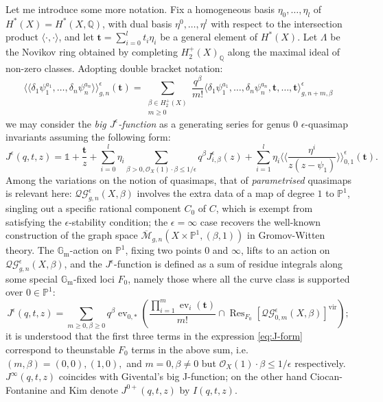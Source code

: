 \documentclass[11pt]{amsart}
\newcommand{\M}[4]{\overline{\mathcal{M}}_{#1,#2}(#3,#4)}
\newcommand{\QGe}[4]{\mathcal{QG}^{\epsilon}_{#1,#2}(#3,#4)}
\newcommand{\PP}{\mathbb P}
\newcommand{\QQ}{\mathbb{Q}}
\newcommand{\OO}{\mathcal{O}}
\newcommand{\Gm}{\mathbb{G}_{\text{m}}}
\newcommand{\virt}[1]{[#1]^{\operatorname{vir}}}
\newcommand{\lala}{\langle\!\langle}
\newcommand{\rara}{\rangle\!\rangle}
\newcommand{\ev}{\operatorname{ev}}
\theoremstyle{definition}
\theoremstyle{definition}
\newcommand{\ilemph}[1]{\emph{#1}}
\begin{document}
Let me introduce some more notation. Fix a homogeneous basis $\eta_0,\ldots,\eta_l$ of $H^*(X)=H^*(X,\QQ)$, with dual basis $\eta^0,\ldots,\eta^l$ with respect to the intersection product $\langle\cdot,\cdot\rangle$, and let $\mathbf{t}=\sum_{i=0}^lt_i\eta_i$ be a general element of $H^*(X)$. Let $\Lambda$ be the Novikov ring obtained by completing $ H_2^+(X)_\QQ$ along the maximal ideal of non-zero classes. Adopting double bracket notation:
\[\lala\delta_1\psi_1^{a_1},\ldots,\delta_n\psi_n^{a_n}\rara^\epsilon_{g,n}(\mathbf{t})=\sum_{\substack{\beta\in H_2^+(X) \\ m\geq 0}}\frac{q^\beta}{m!}\langle \delta_1\psi_1^{a_1},\ldots,\delta_n\psi_n^{a_n},\mathbf t,\ldots,\mathbf t\rangle^{\epsilon}_{g,n+m,\beta} \]
we may consider the \ilemph{big $J^\epsilon$-function} as a generating series for genus $0$ $\epsilon$-quasimap invariants assuming the following form:
\begin{equation}\label{eq:J-form} J^\epsilon(q,t,z)=\mathds{1}+\frac{\mathbf{t}}{z}+\sum_{i=0}^l\eta_i\sum_{\beta> 0,\OO_X(1)\cdot\beta\leq 1/\epsilon}q^\beta J^\epsilon_{i,\beta}(z)+\sum_{i=1}^l\eta_i\lala\frac{\eta^i}{z(z-\psi_1)}\rara^\epsilon_{0,1}(\mathbf{t}).\end{equation}
Among the variations on the notion of quasimaps, that of \ilemph{parametrised} quasimaps is relevant here:
$\QGe{g}{n}{X}{\beta}$ involves the extra data of a map of degree $1$ to $\PP^1$, singling out a specific rational component $C_0$ of $C$, which is exempt from satisfying the $\epsilon$-stability condition; the $\epsilon=\infty$ case recovers the well-known construction of the graph space $\M{g}{n}{X\times\PP^1}{(\beta,1)}$ in Gromov-Witten theory. The $\Gm$-action on $\PP^1$, fixing two points $0$ and $\infty$, lifts to an action on $\QGe{g}{n}{X}{\beta}$, and the $J^\epsilon$-function is defined as a sum of residue integrals along some special $\Gm$-fixed loci $F_0$, namely those where all the curve class is supported over $0\in\PP^1$:
\[J^\epsilon(q,t,z)=\sum_{m\geq0,\beta\geq0}q^\beta \ev_{0,*}\left(\frac{\prod_{i=1}^m \ev_i(\mathbf{t})}{m!}\cap\operatorname{Res}_{F_0}\virt{\QGe{0}{m}{X}{\beta}}\right);\]
it is understood that the first three terms in the expression \eqref{eq:J-form} correspond to theunstable $F_0$ terms in the above sum, i.e. $(m,\beta)=(0,0), (1,0),$ and $m=0,\beta\neq 0$ but $\OO_X(1)\cdot\beta\leq 1/\epsilon$ respectively. $J^\infty(q,t,z)$ coincides with Givental's big J-function; on the other hand Ciocan-Fontanine and Kim denote $J^{0+}(q,t,z)$ by $I(q,t,z)$.
\end{document}
